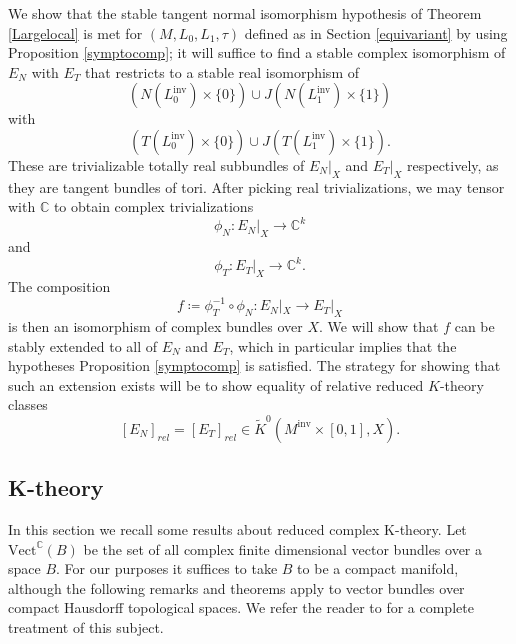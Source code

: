 \documentclass[11pt]{amsart}
\theoremstyle{definition}
\theoremstyle{remark}
\def\C{\mathbb{C}}
\newcommand{\M}{M^{\operatorname{inv}}}
\newcommand{\Lo}{L_0^{\operatorname{inv}}}
\newcommand{\Li}{L_1^{\operatorname{inv}}}
\numberwithin{equation}{section}
\begin{document}
We show that the stable tangent normal isomorphism hypothesis of Theorem \ref{Largelocal} is met for $(M,L_0,L_1,\tau)$ defined as in Section \ref{equivariant} by using Proposition \ref{symptocomp}; it will suffice to find a stable complex isomorphism of $E_N$ with $E_T$ that restricts to a stable real isomorphism of \[(N(\Lo)\times\{0\})\cup J(N(\Li)\times\{1\})\] with \[(T(\Lo)\times\{0\})\cup J(T(\Li)\times\{1\}).\] These are trivializable totally real subbundles of $E_N|_X$ and $E_T|_X$ respectively, as they are tangent bundles of tori. After picking real trivializations, we may tensor with $\C$ to obtain complex trivializations \[\phi_N\colon E_N|_X\to \C^k\] and \[\phi_T\colon E_T|_X\to \C^k.\]The composition \[f\coloneq \phi_T^{-1}\circ \phi_N\colon E_N|_X\to E_T|_X\] is then an isomorphism of complex bundles over $X.$ We will show that $f$ can be stably extended to all of $E_N$ and $E_T$, which in particular implies that the hypotheses Proposition \ref{symptocomp} is satisfied. The strategy for showing that such an extension exists will be to show equality of relative reduced $K$-theory classes \begin{equation}\label{relKtheoryequality}[E_N]_{rel}=[E_T]_{rel}\in \widetilde{K}^0(\M\times[0,1],X).\end{equation}

\subsection{K-theory}
In this section we recall some results about reduced complex K-theory.  Let $\textrm{Vect}^{\mathbb{C}}(B)$ be the set of all complex finite dimensional vector bundles over a space $B$. For our purposes it suffices to take $B$ to be a compact manifold, although the following remarks and theorems apply to vector bundles over compact Hausdorff topological spaces. We refer the reader to \cite{HatcherVB} for a complete treatment of this subject.
\end{document}
